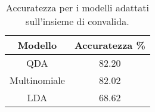 \begin{table}[H]
\centering
\caption{Accuratezza per i modelli adattati sull'insieme di convalida.}
\begin{tabular}{cc}
\toprule
      Modello &  Accuratezza \% \\
\midrule
          QDA &          82.20 \\
 Multinomiale &          82.02 \\
          LDA &          68.62 \\
\bottomrule
\end{tabular}
\label{tab:acc_pen}
\end{table}
